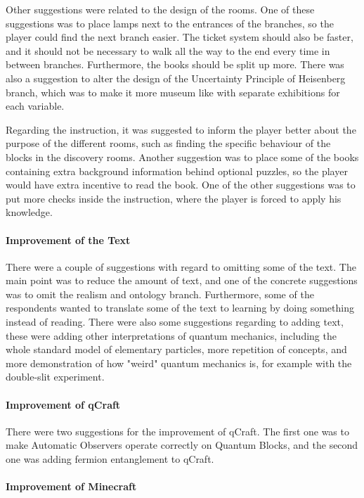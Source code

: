 \documentclass[11pt,twoside]{report} %
\begin{document}
Other suggestions were related to the design of the rooms. One of these suggestions was to place lamps next to the entrances of the branches, so the player could find the next branch easier. The ticket system should also be faster, and it should not be necessary to walk all the way to the end every time in between branches. Furthermore, the books should be split up more. There was also a suggestion to alter the design of the Uncertainty Principle of Heisenberg branch, which was to make it more museum like with separate exhibitions for each variable.

Regarding the instruction, it was suggested to inform the player better about the purpose of the different rooms, such as finding the specific behaviour of the blocks in the discovery rooms. Another suggestion was to place some of the books containing extra background information behind optional puzzles, so the player would have extra incentive to read the book. One of the other suggestions was to put more checks inside the instruction, where the player is forced to apply his knowledge.

\paragraph{Improvement of the Text}

There were a couple of suggestions with regard to omitting some of the text. The main point was to reduce the amount of text, and one of the concrete suggestions was to omit the realism and ontology branch. Furthermore, some of the respondents wanted to translate some of the text to learning by doing something instead of reading. There were also some suggestions regarding to adding text, these were adding other interpretations of quantum mechanics, including the whole standard model of elementary particles, more repetition of concepts, and more demonstration of how "weird" quantum mechanics is, for example with the double-slit experiment. 

\paragraph{Improvement of qCraft}

There were two suggestions for the improvement of qCraft. The first one was to make Automatic Observers operate correctly on Quantum Blocks, and the second one was adding fermion entanglement to qCraft.

\paragraph{Improvement of Minecraft}
\end{document}
